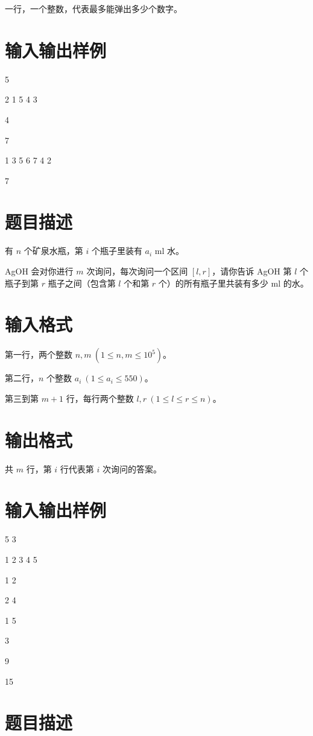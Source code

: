 \documentclass{../cpct/ctpro}
\begin{document}
一行，一个整数，代表最多能弹出多少个数字。

\section*{输入输出样例}

\testcasetab
{
    5\par
    2 1 5 4 3
}
{
    4
}

\testcasetab
{
    7\par
    1 3 5 6 7 4 2
}
{
    7
}

\makeproblem
\section*{题目描述}

有 $n$ 个矿泉水瓶，第 $i$ 个瓶子里装有 $a_i$ ml 水。

AgOH 会对你进行 $m$ 次询问，每次询问一个区间 $[l,r]$，请你告诉 AgOH 第 $l$ 个瓶子到第 $r$ 瓶子之间（包含第 $l$ 个和第 $r$ 个）的所有瓶子里共装有多少 ml 的水。

\section*{输入格式}

第一行，两个整数 $n,m~(1 \leq n,m \leq {10}^5)$。

第二行，$n$ 个整数 $a_i~(1 \leq a_i \leq 550)$。

第三到第 $m+1$ 行，每行两个整数 $l,r~(1 \leq l \leq r \leq n)$。

\section*{输出格式}

共 $m$ 行，第 $i$ 行代表第 $i$ 次询问的答案。

\section*{输入输出样例}

\testcasetab
{
    5 3\par
    1 2 3 4 5\par
    1 2\par
    2 4\par
    1 5
}
{
    3\par
    9\par
    15
}

\makeproblem
\section*{题目描述}
\end{document}

